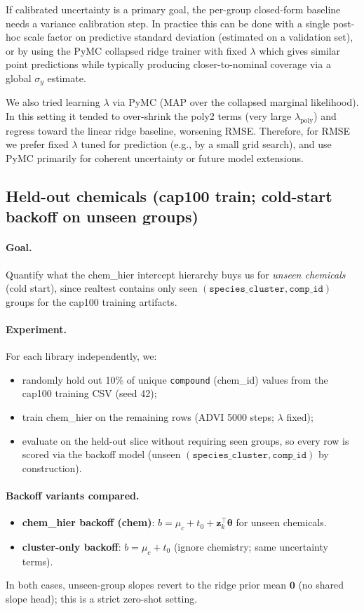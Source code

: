 \documentclass[11pt]{article}
\begin{document}
If calibrated uncertainty is a primary goal, the per-group closed-form baseline needs a variance calibration step. In practice this can
be done with a single post-hoc scale factor on predictive standard deviation (estimated on a validation set), or by using the PyMC
collapsed ridge trainer with fixed $\lambda$ which gives similar point predictions while typically producing closer-to-nominal coverage
via a global $\sigma_y$ estimate.

We also tried learning $\lambda$ via PyMC (MAP over the collapsed marginal likelihood). In this setting it tended to over-shrink the
poly2 terms (very large $\lambda_{\text{poly}}$) and regress toward the linear ridge baseline, worsening RMSE. Therefore, for RMSE we
prefer fixed $\lambda$ tuned for prediction (e.g., by a small grid search), and use PyMC primarily for coherent uncertainty or future
model extensions.

\subsection{Held-out chemicals (cap100 train; cold-start backoff on unseen groups)}

\paragraph{Goal.}
Quantify what the chem\_hier intercept hierarchy buys us for \emph{unseen chemicals} (cold start), since realtest contains only seen
$(\texttt{species\_cluster}, \texttt{comp\_id})$ groups for the cap100 training artifacts.

\paragraph{Experiment.}
For each library independently, we:
\begin{itemize}
  \item randomly hold out 10\% of unique \texttt{compound} (chem\_id) values from the cap100 training CSV (seed 42);
  \item train chem\_hier on the remaining rows (ADVI 5000 steps; $\lambda$ fixed);
  \item evaluate on the held-out slice without requiring seen groups, so every row is scored via the backoff model
        (unseen $(\texttt{species\_cluster}, \texttt{comp\_id})$ by construction).
\end{itemize}

\paragraph{Backoff variants compared.}
\begin{itemize}
  \item \textbf{chem\_hier backoff (chem)}: $b = \mu_{c} + t_0 + \bm{z}_k^\top\bm{\theta}$ for unseen chemicals.
  \item \textbf{cluster-only backoff}: $b = \mu_{c} + t_0$ (ignore chemistry; same uncertainty terms).
\end{itemize}
In both cases, unseen-group slopes revert to the ridge prior mean $\bm{0}$ (no shared slope head); this is a strict zero-shot setting.
\end{document}
